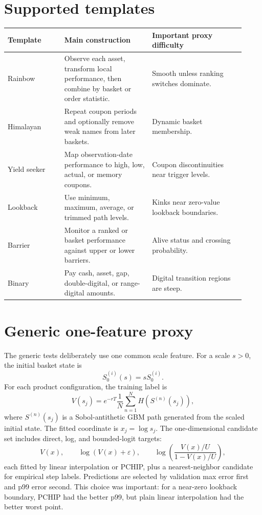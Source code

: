 \documentclass[11pt,oneside]{book}
\theoremstyle{definition}
\begin{document}
\section{Supported templates}
\begin{longtable}{@{}>{\raggedright\arraybackslash}p{0.22\linewidth}>{\raggedright\arraybackslash}p{0.34\linewidth}>{\raggedright\arraybackslash}p{0.36\linewidth}@{}}
\toprule
Template & Main construction & Important proxy difficulty\\
\midrule
Rainbow & Observe each asset, transform local performance, then combine by basket or order statistic. & Smooth unless ranking switches dominate.\\
Himalayan & Repeat coupon periods and optionally remove weak names from later baskets. & Dynamic basket membership.\\
Yield seeker & Map observation-date performance to high, low, actual, or memory coupons. & Coupon discontinuities near trigger levels.\\
Lookback & Use minimum, maximum, average, or trimmed path levels. & Kinks near zero-value lookback boundaries.\\
Barrier & Monitor a ranked or basket performance against upper or lower barriers. & Alive status and crossing probability.\\
Binary & Pay cash, asset, gap, double-digital, or range-digital amounts. & Digital transition regions are steep.\\
\bottomrule
\end{longtable}

\section{Generic one-feature proxy}
The generic tests deliberately use one common scale feature. For a scale
\(s>0\), the initial basket state is
\[
  S_0^{(i)}(s)=sS_0^{(i)}.
\]
For each product configuration, the training label is
\[
  V(s_j)
  =
  e^{-rT}\frac1N\sum_{n=1}^N
  H\!\left(S^{(n)}(s_j)\right),
\]
where \(S^{(n)}(s_j)\) is a Sobol-antithetic GBM path generated from the scaled
initial state. The fitted coordinate is \(x_j=\log s_j\). The one-dimensional
candidate set includes direct, log, and bounded-logit targets:
\[
  V(x),\qquad
  \log(V(x)+\varepsilon),\qquad
  \log\!\left(\frac{V(x)/U}{1-V(x)/U}\right),
\]
each fitted by linear interpolation or PCHIP, plus a nearest-neighbor candidate
for empirical step labels. Predictions are selected by validation max error
first and p99 error second. This choice was important: for a near-zero lookback
boundary, PCHIP had the better p99, but plain linear interpolation had the
better worst point.
\end{document}

